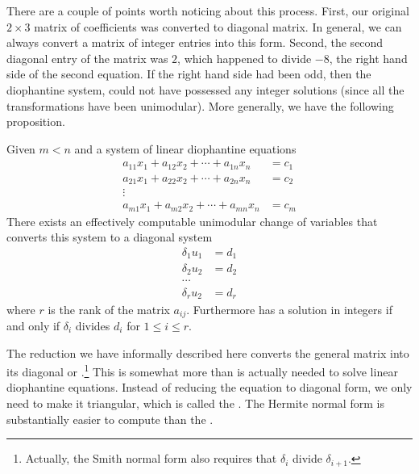 There are a couple of points worth noticing about this process.
First, our original $2\times 3$ matrix of coefficients was converted
to diagonal matrix.  In general, we can always convert a matrix of
integer entries into this form.  Second, the second diagonal entry of
the matrix was $2$, which happened to divide $-8$, the right hand side
of the second equation.  If the right hand side had been odd, then the
diophantine system, could not have possessed any integer solutions
(since all the transformations have been unimodular). More generally, we have the following proposition.

\begin{proposition} Given $m< n$ and a system of linear diophantine
equations
\begin{equation} \label{Dio:Gen:Lin:Eq}
\begin{aligned}
a_{11} x_1 + a_{12} x_2 + \cdots + a_{1n} x_n & = c_1 \\
a_{21} x_1 + a_{22} x_2 + \cdots + a_{2n} x_n & = c_2 \\
 \vdots \\
a_{m1} x_1 + a_{m2} x_2 + \cdots + a_{mn} x_n & = c_m 
\end{aligned}
\end{equation}
There exists an effectively computable unimodular change of variables
that converts this system to a diagonal system
\[
\begin{aligned}
\delta_{1} u_1 & = d_1 \\
\delta_{2} u_2 & = d_2 \\
 \cdots \\
\delta_{r} u_2 & = d_r 
\end{aligned}
\]
where $r$ is the rank of the matrix $a_{ij}$.  Furthermore
 has a solution in integers if and only if
$\delta_i$ divides $d_i$ for $1 \le i \le r$.
\end{proposition}

The reduction we have informally described here converts the general
matrix into its diagonal or .\footnote{Actually, the Smith normal form also requires that
$\delta_i$ divide $\delta_{i+1}$.} This is somewhat more than is
actually needed to solve linear diophantine equations.  Instead of
reducing the equation to diagonal form, we only need to make it
triangular, which is called the .  The
Hermite normal form is substantially easier to compute than the
.

